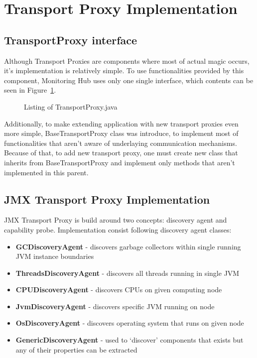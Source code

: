 \pagebreak
\section{Transport Proxy Implementation}
\subsection{TransportProxy interface}
Although Transport Proxies are components where most of actual magic occurs, it\rq{}s implementation is relatively simple. To use functionalities provided by this component, Monitoring Hub uses only one single interface, which contents can be seen in Figure~\ref{fig:transport_proxy}.

\begin{figure}[ht]
  \centering
  
  \caption{Listing of TransportProxy.java}
  \label{fig:transport_proxy}
\end{figure} 

Additionally, to make extending application with new transport proxies even more simple, BaseTransportProxy class was introduce, to implement most of functionalities that aren\rq{}t aware of underlaying communication mechanisms. Because of that, to add new transport proxy, one must create new class that inherits from BaseTransportProxy and implement only methods that aren\rq{}t implemented in this parent.

\subsection{JMX Transport Proxy Implementation}

JMX Transport Proxy is build around two concepts: discovery agent and capability probe. Implementation consist following discovery agent classes:
\begin{itemize} 
  \item{\bf{GCDiscoveryAgent}} - discovers garbage collectors within single running JVM instance boundaries
  \item{\bf{ThreadsDiscoveryAgent}} - discovers all threads running in single JVM
  \item{\bf{CPUDiscoveryAgent}} - discovers CPUs on given computing node
  \item{\bf{JvmDiscoveryAgent}} - discovers specific JVM running on node
  \item{\bf{OsDiscoveryAgent}} - discovers operating system that runs on given node
  \item{\bf{GenericDiscoveryAgent}} - used to \lq{}discover\rq{} components that exists but any of their properties can be extracted
\end{itemize} 

